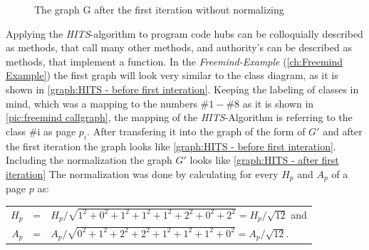 \begin{figure}
  \caption{The graph G after the first iteration without normalizing}
  \label{graph:HITS - before first interation}
\end{figure}

Applying the \emph{HITS}-algorithm to program code hubs can be colloquially described as methods, that call many other methods, and authority's can be described as methods, that implement a function.\newline
In the \textit{Freemind-Example} (\autoref{ch:Freemind Example}) the first graph will look very similar to the class diagram, as it is shown in \autoref{graph:HITS - before first interation}. Keeping the labeling of classes in mind, which was a mapping to the numbers $\#1-\#8$ as it is shown in \autoref{pic:freemind callgraph}, the mapping of the \textit{HITS}-Algorithm is referring to the class \#i as page $p_i$.
After transfering it into the graph of the form of $G'$ and after the first iteration the graph looks like \autoref{graph:HITS - before first interation}. \newline \newline  
Including the normalization the graph $G'$ looks like \autoref{graph:HITS - after first iteration}
The normalization was done by calculating for every $H_p$ and $A_p$ of a page $p$ as:\newline
\begin{center}
  	\vspace{-2em}
  	\begin{tabular}{ r c l }
  		$H_p$ & = &$H_p / \sqrt{1^2+0^2+1^2+1^2+1^2+2^2+0^2+2^2} = H_p/ \sqrt{12}$ and \\
  		$A_p$ & = &$ A_p / \sqrt{0^2+1^2+2^2+2^2+1^2+1^2+1^2+0^2} = A_p/ \sqrt{12}$. \\
	\end{tabular}
\end{center} 

